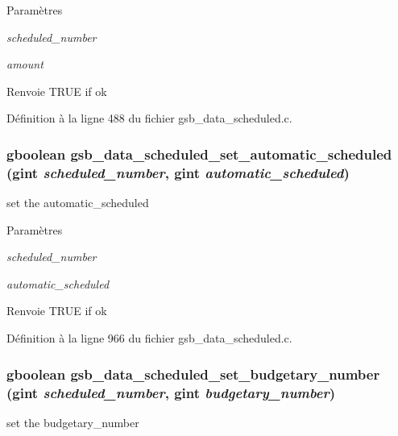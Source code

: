 \begin{DoxyParams}{Paramètres}
\item[{\em scheduled\_\-number}]\item[{\em amount}]\end{DoxyParams}
\begin{DoxyReturn}{Renvoie}
TRUE if ok 
\end{DoxyReturn}


Définition à la ligne 488 du fichier gsb\_\-data\_\-scheduled.c.

\subsubsection[{gsb\_\-data\_\-scheduled\_\-set\_\-automatic\_\-scheduled}]{\setlength{\rightskip}{0pt plus 5cm}gboolean gsb\_\-data\_\-scheduled\_\-set\_\-automatic\_\-scheduled (gint {\em scheduled\_\-number}, \/  gint {\em automatic\_\-scheduled})}\label{gsb__data__scheduled_8h_a9ef9808e521e8ba0651d9ca8c3e57e83}
set the automatic\_\-scheduled


\begin{DoxyParams}{Paramètres}
\item[{\em scheduled\_\-number}]\item[{\em automatic\_\-scheduled}]\end{DoxyParams}
\begin{DoxyReturn}{Renvoie}
TRUE if ok 
\end{DoxyReturn}


Définition à la ligne 966 du fichier gsb\_\-data\_\-scheduled.c.

\subsubsection[{gsb\_\-data\_\-scheduled\_\-set\_\-budgetary\_\-number}]{\setlength{\rightskip}{0pt plus 5cm}gboolean gsb\_\-data\_\-scheduled\_\-set\_\-budgetary\_\-number (gint {\em scheduled\_\-number}, \/  gint {\em budgetary\_\-number})}\label{gsb__data__scheduled_8h_a2e5a09822c03b4147c3d0b7c0b727e78}
set the budgetary\_\-number


